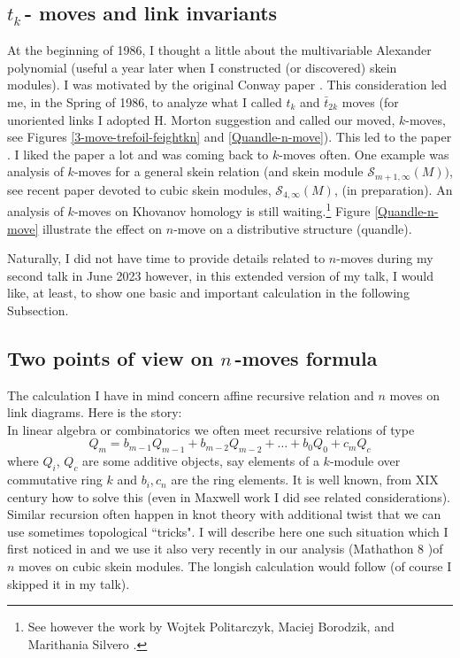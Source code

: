 \documentclass[12pt]{amsart}
\begin{document}
\subsection{\texorpdfstring{$t_k$\,- moves and link invariants}{t2S1}}\label{3.5}
At the beginning of 1986, I thought a little about the multivariable Alexander polynomial (useful a year later when I constructed (or discovered) skein modules). I was motivated by the original Conway paper \cite{Con}. This consideration led me, in the Spring of 1986, to analyze what I called $t_k$ and $\bar t_{2k}$ moves (for unoriented links I adopted H. Morton suggestion and called our moved, $k$-moves, see Figures \ref{3-move-trefoil-feightkn} and \ref{Quandle-n-move}). This led to the paper \cite{Prz1}. I liked the paper a lot and was coming back to $k$-moves often. One example was analysis of $k$-moves for a general skein relation (and skein module $\mathcal S_{m+1,\infty}(M))$, see recent paper \cite{BCGIKMMPW} devoted to cubic skein modules, $\mathcal S_{4,\infty}(M)$, (in preparation).
An analysis of $k$-moves on Khovanov homology \cite{Kho} is still waiting.\footnote{See however the work by Wojtek Politarczyk, Maciej Borodzik, and Marithania Silvero  \cite{BPS}.} Figure \ref{Quandle-n-move} illustrate the effect on $n$-move on a distributive structure (quandle).

Naturally, I did not have time to provide details related to $n$-moves during my second talk in June 2023 however, in this extended version of my talk, I would like, at least, to show one basic and important calculation in the following Subsection.

\subsection{Two points of view on \texorpdfstring{$n$\,-moves formula}{n2S1}}\label{TwoPoint}
The calculation I have in mind concern affine recursive relation and $n$ moves on link diagrams. Here is the story:\\
In linear algebra or combinatorics we often meet recursive relations of type
\begin{equation*}
Q_m = b_{m-1}Q_{m-1}+b_{m-2}Q_{m-2}+\ldots+b_0Q_0 +c_mQ_c
\end{equation*}
where $Q_i$, $Q_c$ are some additive objects, say elements of a $k$-module over commutative ring $k$ and 
$b_i,c_n$ are the ring elements. 
It is well known, from XIX century how to solve this (even in Maxwell work I did see related considerations). Similar recursion often happen in knot theory with additional twist that we can use sometimes topological ``tricks". I will describe here one such situation which I first noticed in \cite{Prz1} and we use it also very recently in 
our analysis (Mathathon 8 \cite{BCGIKMMPW} )of $n$ moves on cubic skein modules. The longish calculation would follow (of course I skipped it in my talk).
\end{document}
